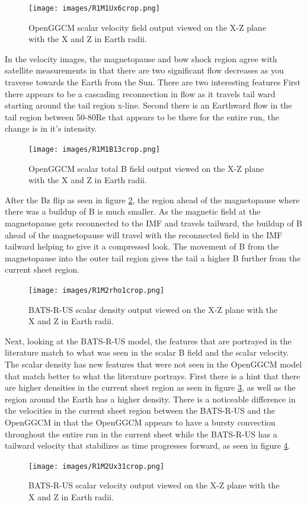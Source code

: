 \begin{figure}
	\centering
	\texttt{[image: images/R1M1Ux6crop.png]}
	\caption{OpenGGCM scalar velocity field output viewed on the X-Z plane with the
	X and Z in Earth radii. }
    \label{fig:R1M1Ux6crop}
	\figSpace
\end{figure}
In the velocity images, the magnetopause and bow shock region agree with
satellite measurements in that there are two significant flow decreases as
you traverse towards the Earth from the Sun. There are two interesting features
First there appears to be a cascading reconnection in flow as it travels
tail ward starting around the tail region x-line. Second there is an Earthward
flow in the tail region between 50-80Re that appears to be there for the entire
run, the change is in it's intensity.
\begin{figure}
	\centering
	\texttt{[image: images/R1M1B13crop.png]}
	\caption{OpenGGCM scalar total B field output viewed on the X-Z plane with the
	X and Z in Earth radii. }
    \label{fig:R1M1B13crop}
	\figSpace
\end{figure}
After the Bz flip as seen in figure \ref{fig:R1M1B13crop}, the region ahead of
the magnetopause where there was a buildup of B is much smaller. As the magnetic
field at the magnetopause gets reconnected to the IMF and travels tailward, the
buildup of B ahead of the magnetopause will travel with the reconnected field in
the IMF tailward helping to give it a compressed look. The movement of B from
the magnetopause into the outer tail region gives the tail a higher B further
from the current sheet region.

\begin{figure}
	\centering
	\texttt{[image: images/R1M2rho1crop.png]}
	\caption{BATS-R-US scalar density output viewed on the X-Z plane with the
	X and Z in Earth radii. }
    \label{fig:R1M2rho1crop}
	\figSpace
\end{figure}
Next, looking at the BATS-R-US model, the features that are portrayed in the
literature match to what was seen in the scalar B field and the scalar
velocity. The scalar density has new features that were not seen in the OpenGGCM
model that match better to what the literature portrays. First there is a hint
that there are higher densities in the current sheet region as seen in figure
\ref{fig:R1M2rho1crop}, as well as the region around the Earth has a higher
density.
There is a noticeable difference in the velocities in the current sheet region
between the BATS-R-US and the OpenGGCM in that the OpenGGCM appears to have a
bursty convection throughout the entire run in the current sheet while the
BATS-R-US has a tailward velocity that stabilizes as time progresses forward, as
seen in figure \ref{fig:R1M2Ux31crop}.
\begin{figure}
	\centering
	\texttt{[image: images/R1M2Ux31crop.png]}
	\caption{BATS-R-US scalar velocity output viewed on the X-Z plane with the
	X and Z in Earth radii. }
    \label{fig:R1M2Ux31crop}
	\figSpace
\end{figure}

